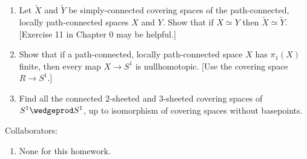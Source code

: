 \documentclass[12pt,letterpaper]{article}
\begin{document}
\begin{enumerate}
\pagebreak


\setcounter{enumi}{7}
\item Let $\tilde{X}$ and $\tilde{Y}$ be simply-connected covering spaces of the path-connected, locally path-connected spaces $X$ and $Y$. Show that if $X \simeq Y$ then $\tilde{X} \simeq \tilde{Y}$. [Exercise 11 in Chapter 0 may be helpful.]


\item Show that if a path-connected, locally path-connected space $X$ has $\pi_1(X)$ finite, then every map $X\to S^1$ is nullhomotopic.  [Use the covering space $R\to S^1$.]


\item Find all the connected 2-sheeted and 3-sheeted covering spaces of $S^1\wedgeprod S^1$, up to isomorphism of covering spaces without basepoints.


\end{enumerate}
\vfill

Collaborators:
\begin{enumerate}
\item[] None for this homework.
\end{enumerate}
\end{document}
